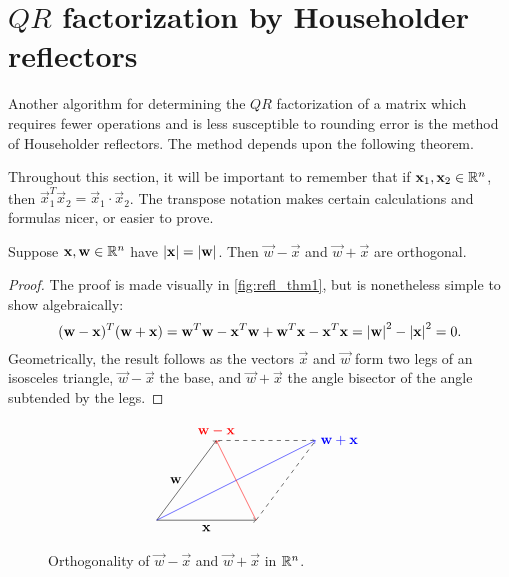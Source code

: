 \documentclass[m3380-lec-main.tex]{subfiles}
\begin{document}
\section{$QR$ factorization by Householder reflectors}

Another algorithm for determining the $QR$ factorization of a matrix which requires fewer operations and is less susceptible to rounding error is the method of Householder reflectors. The method depends upon the following theorem.
\begin{rem} Throughout this section, it will be important to remember that if $\mathbf{x}_1,\mathbf{x}_2\in\mathbb{R}^n$, then $\vec{x}_1^T\vec{x}_2 = \vec{x}_1\cdot\vec{x}_2$. The transpose notation makes certain calculations and formulas nicer, or easier to prove.
\end{rem}

\begin{thm} Suppose $\mathbf{x},\mathbf{w}\in\mathbb{R}^n$ have $\left|\mathbf{x}\right|=\left|\mathbf{w}\right|$. Then $\vec{w}-\vec{x}$ and $\vec{w}+\vec{x}$ are orthogonal.
\end{thm}
\begin{proof} The proof is made visually in \autoref{fig:refl_thm1}, but is nonetheless simple to show algebraically:
\[ (\mathbf{w}-\mathbf{x})^T(\mathbf{w}+\mathbf{x}) = \mathbf{w}^T\mathbf{w}-\mathbf{x}^T\mathbf{w}+\mathbf{w}^T\mathbf{x}-\mathbf{x}^T\mathbf{x} = \left|\mathbf{w}\right|^2-\left|\mathbf{x}\right|^2 = 0. \]
Geometrically, the result follows as the vectors $\vec{x}$ and $\vec{w}$ form two legs of an isosceles triangle, $\vec{w}-\vec{x}$ the base, and $\vec{w}+\vec{x}$ the angle bisector of the angle subtended by the legs.
\end{proof}

\begin{figure}[hbt]
\[\begin{tikzpicture}[scale=1/2]
\draw [->] (0,0) -- node [left] {$\vec{w}$} (3,4);
\draw [->] (0,0) -- node [below] {$\vec{x}$} (5,0);
\draw [dashed] (5,0) -- (8,4) -- (3,4);
\draw [->, draw = blue]  (0,0) -- (8,4) node [right] {\color{blue}$\vec{w}+\vec{x}$} ;
\draw [->, draw = red] (5,0) -- (3,4) node [above] {\color{red}$\vec{w}-\vec{x}$} ;
\end{tikzpicture}\]
\caption{\label{fig:refl_thm1} Orthogonality of $\vec{w}-\vec{x}$ and $\vec{w}+\vec{x}$ in $\mathbb{R}^n$.}
\end{figure}
\end{document}
